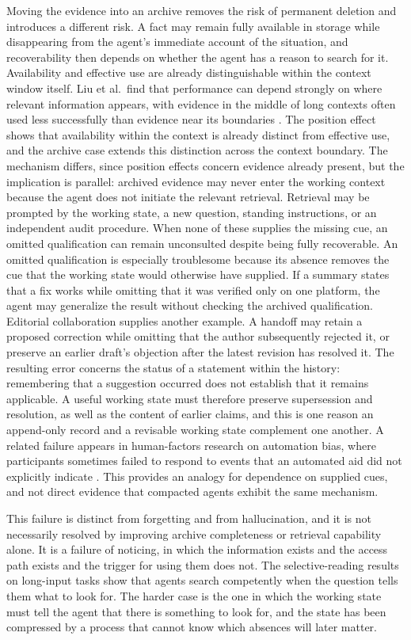 \documentclass[11pt]{article}
\begin{document}
Moving the evidence into an archive removes the risk of permanent deletion and introduces a different risk. A fact may remain fully available in storage while disappearing from the agent's immediate account of the situation, and recoverability then depends on whether the agent has a reason to search for it. Availability and effective use are already distinguishable within the context window itself. Liu et al.\ find that performance can depend strongly on where relevant information appears, with evidence in the middle of long contexts often used less successfully than evidence near its boundaries \cite{liu2024}. The position effect shows that availability within the context is already distinct from effective use, and the archive case extends this distinction across the context boundary. The mechanism differs, since position effects concern evidence already present, but the implication is parallel: archived evidence may never enter the working context because the agent does not initiate the relevant retrieval. Retrieval may be prompted by the working state, a new question, standing instructions, or an independent audit procedure. When none of these supplies the missing cue, an omitted qualification can remain unconsulted despite being fully recoverable. An omitted qualification is especially troublesome because its absence removes the cue that the working state would otherwise have supplied. If a summary states that a fix works while omitting that it was verified only on one platform, the agent may generalize the result without checking the archived qualification. Editorial collaboration supplies another example. A handoff may retain a proposed correction while omitting that the author subsequently rejected it, or preserve an earlier draft's objection after the latest revision has resolved it. The resulting error concerns the status of a statement within the history: remembering that a suggestion occurred does not establish that it remains applicable. A useful working state must therefore preserve supersession and resolution, as well as the content of earlier claims, and this is one reason an append-only record and a revisable working state complement one another. A related failure appears in human-factors research on automation bias, where participants sometimes failed to respond to events that an automated aid did not explicitly indicate \cite{skitka1999}. This provides an analogy for dependence on supplied cues, and not direct evidence that compacted agents exhibit the same mechanism.

This failure is distinct from forgetting and from hallucination, and it is not necessarily resolved by improving archive completeness or retrieval capability alone. It is a failure of noticing, in which the information exists and the access path exists and the trigger for using them does not. The selective-reading results on long-input tasks show that agents search competently when the question tells them what to look for. The harder case is the one in which the working state must tell the agent that there is something to look for, and the state has been compressed by a process that cannot know which absences will later matter.
\end{document}
